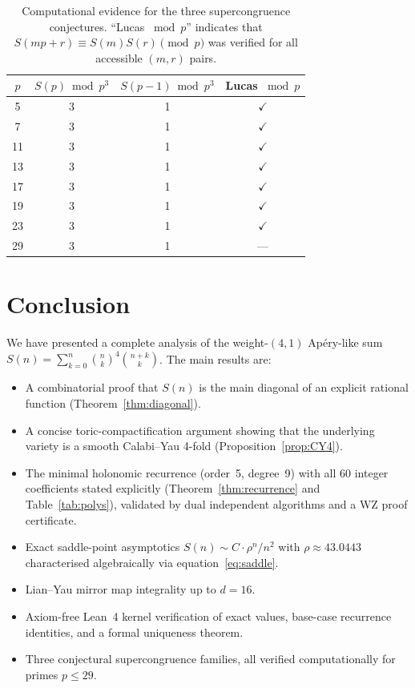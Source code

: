 \documentclass[11pt, a4paper]{article}
\begin{document}
\begin{table}[ht]
\centering
\begin{tabular}{@{}cccc@{}}
\toprule
$p$ & $S(p)\bmod p^3$ & $S(p-1)\bmod p^3$ & Lucas $\bmod p$ \\
\midrule
5  & 3 & 1 & $\checkmark$ \\
7  & 3 & 1 & $\checkmark$ \\
11 & 3 & 1 & $\checkmark$ \\
13 & 3 & 1 & $\checkmark$ \\
17 & 3 & 1 & $\checkmark$ \\
19 & 3 & 1 & $\checkmark$ \\
23 & 3 & 1 & $\checkmark$ \\
29 & 3 & 1 & --- \\
\bottomrule
\end{tabular}
\caption{%
  Computational evidence for the three supercongruence conjectures.
  ``Lucas $\bmod p$'' indicates that $S(mp+r)\equiv S(m)S(r)\pmod{p}$
  was verified for all accessible $(m,r)$ pairs.%
}
\label{tab:cong}
\end{table}


\section{Conclusion}\label{sec:conclusion}

We have presented a complete analysis of the weight-$(4,1)$ Ap\'ery-like
sum $S(n)=\sum_{k=0}^n\binom{n}{k}^4\binom{n+k}{k}$.  The main results are:
\begin{itemize}
  \item A combinatorial proof that $S(n)$ is the main diagonal of an
        explicit rational function (Theorem~\ref{thm:diagonal}).
  \item A concise toric-compactification argument showing that the
        underlying variety is a smooth Calabi--Yau 4-fold
        (Proposition~\ref{prop:CY4}).
  \item The minimal holonomic recurrence (order~5, degree~9) with all
        60 integer coefficients stated explicitly (Theorem~\ref{thm:recurrence}
        and Table~\ref{tab:polys}), validated by dual independent
        algorithms and a WZ proof certificate.
  \item Exact saddle-point asymptotics $S(n)\sim C\cdot\rho^n/n^2$
        with $\rho\approx 43.0443$ characterised algebraically via
        equation~\eqref{eq:saddle}.
  \item Lian--Yau mirror map integrality up to $d=16$.
  \item Axiom-free Lean~4 kernel verification of exact values, base-case
        recurrence identities, and a formal uniqueness theorem.
  \item Three conjectural supercongruence families, all verified
        computationally for primes $p\le 29$.
\end{itemize}
\end{document}
